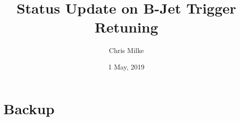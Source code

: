 \documentclass{beamer}
\begin{document}
\title{Status Update on B-Jet Trigger Retuning}   
\author{Chris Milke} 
\date{1 May, 2019} 

\frame{\titlepage} 




\section{Backup} 
\end{document}
